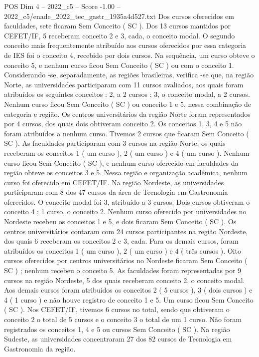 \begin{textsample}{POS Dim 4 – 2022\_c5 – Score -1.00 – 2022\_c5/enade\_2022\_tec\_gastr\_1935a4d527.txt}
Dos cursos oferecidos em faculdades, sete ficaram Sem Conceito ( SC ).
Dos 13 cursos mantidos por CEFET/IF, 5 receberam conceito 2 e 3, cada, o conceito modal.
O segundo conceito mais frequentemente atribuído aos cursos oferecidos por essa categoria de IES foi o conceito 4, recebido por dois cursos.
Na sequência, um curso obteve o conceito 5, e nenhum curso ficou Sem Conceito ( SC ) ou com o conceito 1.
Considerando -se, separadamente, as regiões brasileiras, verifica -se que, na região Norte, as universidades participaram com 11 cursos avaliados, aos quais foram atribuídos os seguintes conceitos : 2, a 2 cursos ; 3, o conceito modal, a 2 cursos.
Nenhum curso ficou Sem Conceito ( SC ) ou conceito 1 e 5, nessa combinação de categoria e região.
Os centros universitários da região Norte foram representados por 4 cursos, dos quais dois obtiveram conceito 2.
Os conceitos 1, 3, 4 e 5 não foram atribuídos a nenhum curso.
Tivemos 2 cursos que ficaram Sem Conceito ( SC ).
As faculdades participaram com 3 cursos na região Norte, os quais receberam os conceitos 1 ( um curso ), 2 ( um curso ) e 4 ( um curso ).
Nenhum curso ficou Sem Conceito ( SC ), e nenhum curso oferecido em faculdades da região obteve os conceitos 3 e 5.
Nessa região e organização acadêmica, nenhum curso foi oferecido em CEFET/IF.
Na região Nordeste, as universidades participaram com 8 dos 47 cursos da área de Tecnologia em Gastronomia oferecidos.
O conceito modal foi 3, atribuído a 3 cursos.
Dois cursos obtiveram o conceito 4 ; 1 curso, o conceito 2.
Nenhum curso oferecido por universidades no Nordeste recebeu os conceitos 1 e 5, e dois ficaram Sem Conceito ( SC ).
Os centros universitários contaram com 24 cursos participantes na região Nordeste, dos quais 6 receberam os conceitos 2 e 3, cada.
Para os demais cursos, foram atribuídos os conceitos 1 ( um curso ), 2 ( um curso ) e 4 ( três cursos ).
Oito cursos oferecidos por centros universitários no Nordeste ficaram Sem Conceito ( SC ) ; nenhum recebeu o conceito 5.
As faculdades foram representadas por 9 cursos na região Nordeste, 5 dos quais receberam conceito 2, o conceito modal.
Aos demais cursos foram atribuídos os conceitos 2 ( 5 cursos ), 3 ( dois cursos ) e 4 ( 1 curso ) e não houve registro de conceito 1 e 5.
Um curso ficou Sem Conceito ( SC ).
Nos CEFET/IF, tivemos 6 cursos no total, sendo que obtiveram o conceito 2 o total de 5 cursos e o conceito 3 o total de um 1 curso.
Não foram registrados os conceitos 1, 4 e 5 ou cursos Sem Conceito ( SC ).
Na região Sudeste, as universidades concentraram 27 dos 82 cursos de Tecnologia em Gastronomia da região.

\end{textsample}
